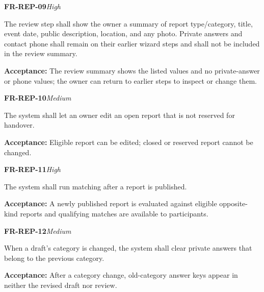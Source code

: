 \documentclass[12pt,a4paper,oneside]{report}
\begin{document}
\noindent\begin{minipage}{\linewidth}\textbf{FR-REP-09}\hfill\textit{High}\par\nopagebreak

The review step shall show the owner a summary of report type/category, title, event date, public description, location, and any photo. Private answers and contact phone shall remain on their earlier wizard steps and shall not be included in the review summary.

{\color{muted}\textbf{Acceptance:} The review summary shows the listed values and no private-answer or phone values; the owner can return to earlier steps to inspect or change them.\par}\end{minipage}\par\vspace{5pt}

\noindent\begin{minipage}{\linewidth}\textbf{FR-REP-10}\hfill\textit{Medium}\par\nopagebreak

The system shall let an owner edit an open report that is not reserved for handover.

{\color{muted}\textbf{Acceptance:} Eligible report can be edited; closed or reserved report cannot be changed.\par}\end{minipage}\par\vspace{5pt}

\noindent\begin{minipage}{\linewidth}\textbf{FR-REP-11}\hfill\textit{High}\par\nopagebreak

The system shall run matching after a report is published.

{\color{muted}\textbf{Acceptance:} A newly published report is evaluated against eligible opposite-kind reports and qualifying matches are available to participants.\par}\end{minipage}\par\vspace{5pt}

\noindent\begin{minipage}{\linewidth}\textbf{FR-REP-12}\hfill\textit{Medium}\par\nopagebreak

When a draft's category is changed, the system shall clear private answers that belong to the previous category.

{\color{muted}\textbf{Acceptance:} After a category change, old-category answer keys appear in neither the revised draft nor review.\par}\end{minipage}\par\vspace{5pt}
\end{document}
